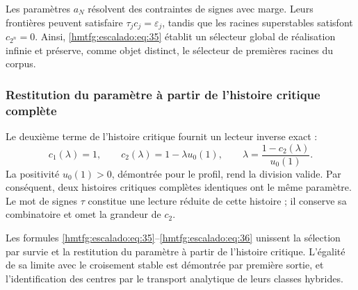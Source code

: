 Les paramètres \(a_N\) résolvent des contraintes de signes avec marge. Leurs frontières peuvent satisfaire \(\tau_jc_j=\varepsilon_j\), tandis que les racines superstables satisfont \(c_{2^n}=0\). Ainsi, \eqref{hmtfg:escalado:eq:35} établit un sélecteur global de réalisation infinie et préserve, comme objet distinct, le sélecteur de premières racines du corpus.

\subsubsection{Restitution du paramètre à partir de l’histoire critique complète}
\label{hmtfg:escalado:13.7}

Le deuxième terme de l’histoire critique fournit un lecteur inverse exact :
\begin{equation}
c_1(\lambda)=1,\qquad
c_2(\lambda)=1-\lambda u_0(1),\qquad
\boxed{\lambda=\frac{1-c_2(\lambda)}{u_0(1)}.}
\label{hmtfg:escalado:eq:36}
\end{equation}
La positivité \(u_0(1)>0\), démontrée pour le profil, rend la division valide. Par conséquent, deux histoires critiques complètes identiques ont le même paramètre. Le mot de signes \(\tau\) constitue une lecture réduite de cette histoire ; il conserve sa combinatoire et omet la grandeur de \(c_2\).

Les formules \eqref{hmtfg:escalado:eq:35}–\eqref{hmtfg:escalado:eq:36} unissent la sélection par survie et la restitution du paramètre à partir de l’histoire critique. L’égalité de sa limite avec le croisement stable est démontrée par première sortie, et l’identification des centres par le transport analytique de leurs classes hybrides.

